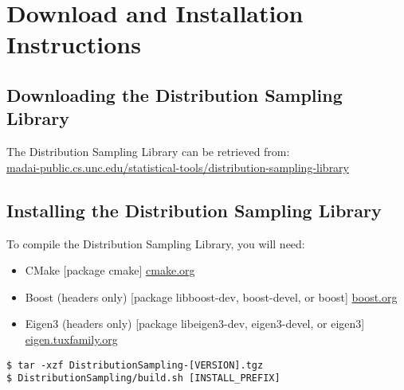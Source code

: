 \section{Download and Installation Instructions}

\subsection{Downloading the Distribution Sampling Library}

The Distribution Sampling Library can be retrieved from: \\
\href{https://madai-public.cs.unc.edu/statistical-tools/distribution-sampling-library/}{madai-public.cs.unc.edu/statistical-tools/distribution-sampling-library}

\subsection{Installing the Distribution Sampling Library}

To compile the Distribution Sampling Library, you will need:
\begin{itemize}
\item CMake [package cmake] \href{http://www.cmake.org/cmake/resources/software.html}{cmake.org}
\item Boost (headers only) [package libboost-dev, boost-devel, or boost] \href{http://www.boost.org/users/download/}{boost.org}
\item Eigen3 (headers only) [package libeigen3-dev, eigen3-devel, or eigen3]
\href{http://eigen.tuxfamily.org/}{eigen.tuxfamily.org}
\end{itemize}

\begin{verbatim}
$ tar -xzf DistributionSampling-[VERSION].tgz
$ DistributionSampling/build.sh [INSTALL_PREFIX]
\end{verbatim}



